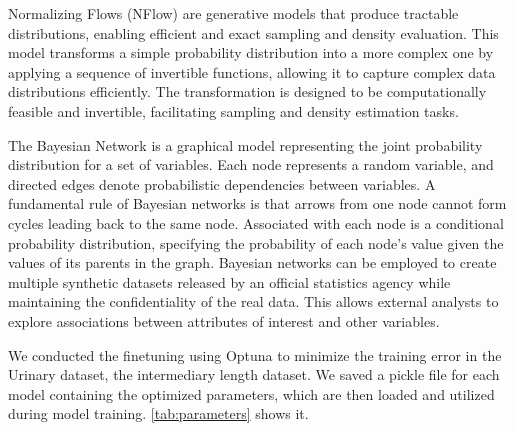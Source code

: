 \documentclass{article}
\theoremstyle{plain}
\theoremstyle{definition}
\theoremstyle{remark}
\begin{document}
Normalizing Flows (NFlow) \cite{Kobyzev2021} are generative models that produce tractable distributions, enabling efficient and exact sampling and density evaluation. This model transforms a simple probability distribution into a more complex one by applying a sequence of invertible functions, allowing it to capture complex data distributions efficiently. The transformation is designed to be computationally feasible and invertible, facilitating sampling and density estimation tasks.

The Bayesian Network \cite{young2009using} is a graphical model representing the joint probability distribution for a set of variables. Each node represents a random variable, and directed edges denote probabilistic dependencies between variables. A fundamental rule of Bayesian networks is that arrows from one node cannot form cycles leading back to the same node. Associated with each node is a conditional probability distribution, specifying the probability of each node's value given the values of its parents in the graph. Bayesian networks can be employed to create multiple synthetic datasets released by an official statistics agency while maintaining the confidentiality of the real data. This allows external analysts to explore associations between attributes of interest and other variables.

We conducted the finetuning using Optuna \cite{akiba2019optuna}  to minimize the training error in the Urinary dataset, the intermediary length dataset. We saved a pickle file for each model containing the optimized parameters, which are then loaded and utilized during model training.  \ref{tab:parameters} shows it.
\end{document}
